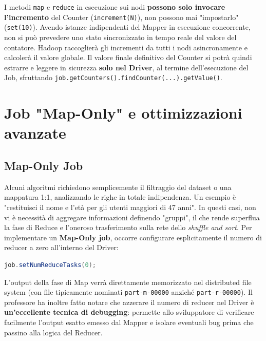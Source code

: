 \begin{remark}
I metodi \texttt{map} e \texttt{reduce} in esecuzione sui nodi \textbf{possono solo invocare l'incremento} del Counter (\texttt{increment(N)}), non possono mai "impostarlo" (\texttt{set(10)}). Avendo istanze indipendenti del Mapper in esecuzione concorrente, non si può prevedere uno stato sincronizzato in tempo reale del valore del contatore. Hadoop raccoglierà gli incrementi da tutti i nodi asincronamente e calcolerà il valore globale.
Il valore finale definitivo del Counter si potrà quindi estrarre e leggere in sicurezza \textbf{solo nel Driver}, al termine dell'esecuzione del Job, sfruttando \texttt{job.getCounters().findCounter(...).getValue()}.
\end{remark}

\section{Job "Map-Only" e ottimizzazioni avanzate}

\subsection{Map-Only Job}
Alcuni algoritmi richiedono semplicemente il filtraggio del dataset o una mappatura 1:1, analizzando le righe in totale indipendenza. Un esempio è "restituisci il nome e l'età per gli utenti maggiori di 47 anni". 
In questi casi, non vi è necessità di aggregare informazioni definendo "gruppi", il che rende superflua la fase di Reduce e l'oneroso trasferimento sulla rete dello \textit{shuffle and sort}.
Per implementare un \textbf{Map-Only job}, occorre configurare esplicitamente il numero di reducer a zero all'interno del Driver:
\begin{lstlisting}[language=Java]
job.setNumReduceTasks(0);
\end{lstlisting}
L'output della fase di Map verrà direttamente memorizzato nel distributed file system (con file tipicamente nominati \texttt{part-m-00000} anziché \texttt{part-r-00000}).
Il professore ha inoltre fatto notare che azzerare il numero di reducer nel Driver è \textbf{un'eccellente tecnica di debugging}: permette allo sviluppatore di verificare facilmente l'output esatto emesso dal Mapper e isolare eventuali bug prima che passino alla logica del Reducer.

